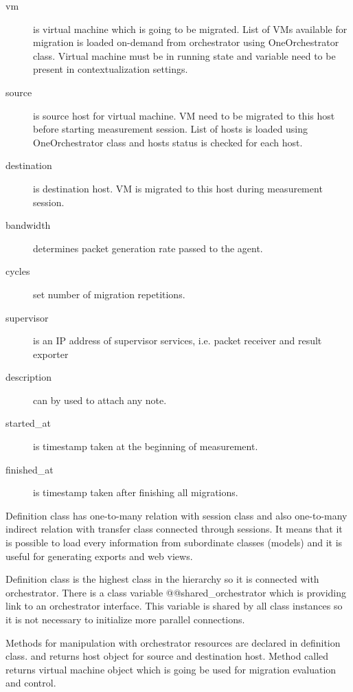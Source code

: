 \begin{description}
	\item[vm] is virtual machine which is going to be migrated. List of \Ac{VM}s available for migration is loaded on-demand from orchestrator using OneOrchestrator class. Virtual machine must be in running state and variable  need to be present in contextualization settings.
	\item[source] is source host for virtual machine. \Ac{VM} need to be migrated to this host before starting measurement session. List of hosts is loaded using OneOrchestrator class and hosts status is checked for each host.
	\item[destination] is destination host. \Ac{VM} is migrated to this host during measurement session.
	\item[bandwidth] determines packet generation rate passed to the agent.
	\item[cycles] set number of migration repetitions.
	\item[supervisor] is an \Ac{IP} address of supervisor services, i.e. packet receiver and result exporter
	\item[description] can by used to attach any note.

	\item[started\_at] is timestamp taken at the beginning of measurement.
	\item[finished\_at] is timestamp taken after finishing all migrations.
\end{description}

Definition class has one-to-many relation with session class and also one-to-many indirect relation with transfer class connected through sessions. It means that it is possible to load every information from subordinate classes (models) and it is useful for generating exports and web views.

Definition class is the highest class in the hierarchy so it is connected with orchestrator. There is a class variable {@@shared\_orchestrator} which is providing link to an orchestrator interface. This variable is shared by all class instances so it is not necessary to initialize more parallel connections.

Methods for manipulation with orchestrator resources are declared in definition class.  and  returns host object for source and destination host. Method called  returns virtual machine object which is going be used for migration evaluation and control.

